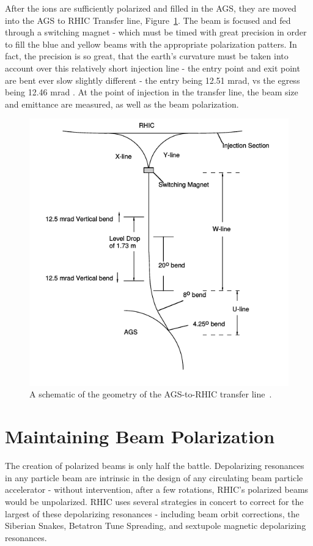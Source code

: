 After the ions are sufficiently polarized and filled in the AGS, they are moved
into the AGS to RHIC Transfer line, Figure~\ref{fig:ags_to_rhic}. The beam is
focused and fed through a switching magnet - which must be timed with great
precision in order to fill the blue and yellow beams with the appropriate
polarization patters. In fact, the precision is so great, that the earth's
curvature must be taken into account over this relatively short injection line -
the entry point and exit point are bent ever slow slightly different - the entry
being 12.51 mrad, vs the egress being 12.46 mrad \cite{RHIC2006}. At the point
of injection in the transfer line, the beam size and emittance are measured, as
well as the beam polarization. 

\begin{figure}
  \centering
  \includegraphics[width=0.6\linewidth]{./figures/ags_to_rhic_transfer}
  \caption{
    A schematic of the geometry of the AGS-to-RHIC transfer line~\cite{RHIC2006}.
  }
  \label{fig:ags_to_rhic}
\end{figure}

\clearpage
\section{Maintaining Beam Polarization}
\label{sec:beam_polarization}

The creation of polarized beams is only half the battle. Depolarizing resonances
in any particle beam are intrinsic in the design of any circulating beam
particle accelerator - without intervention, after a few rotations, RHIC's
polarized beams would be unpolarized. RHIC uses several strategies in concert to
correct for the largest of these depolarizing resonances - including beam orbit
corrections, the Siberian Snakes, Betatron Tune Spreading, and sextupole
magnetic depolarizing resonances. 

